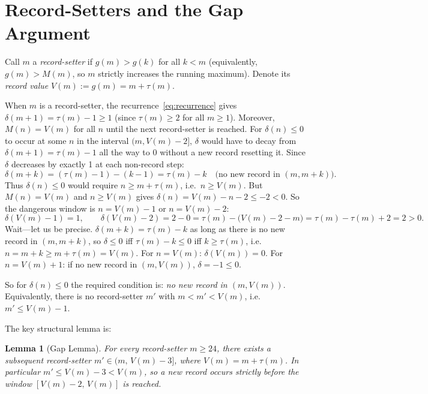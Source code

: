 \documentclass[12pt]{article}
\theoremstyle{plain}
\newtheorem{lemma}[theorem]{Lemma}
\theoremstyle{definition}
\begin{document}
\section{Record-Setters and the Gap Argument}

Call $m$ a \emph{record-setter} if $g(m) > g(k)$ for all $k < m$ (equivalently,
$g(m) > M(m)$, so $m$ strictly increases the running maximum).
Denote its \emph{record value} $V(m) := g(m) = m + \tau(m)$.

When $m$ is a record-setter, the recurrence~\eqref{eq:recurrence} gives
$\delta(m+1) = \tau(m) - 1 \geq 1$ (since $\tau(m) \geq 2$ for all $m \geq 1$).
Moreover, $M(n) = V(m)$ for all $n$ until the next record-setter is reached.
For $\delta(n) \leq 0$ to occur at some $n$ in the interval $(m, V(m)-2]$,
$\delta$ would have to decay from $\delta(m+1) = \tau(m)-1$ all the way to $0$ without
a new record resetting it.  Since $\delta$ decreases by exactly 1 at each non-record step:
\[
  \delta(m + k) = (\tau(m) - 1) - (k - 1) = \tau(m) - k
  \quad \text{(no new record in $(m, m+k)$)}.
\]
Thus $\delta(n) \leq 0$ would require $n \geq m + \tau(m)$, i.e.\ $n \geq V(m)$.
But $M(n) = V(m)$ and $n \geq V(m)$ gives $\delta(n) = V(m) - n - 2 \leq -2 < 0$.
So the dangerous window is $n = V(m) - 1$ or $n = V(m) - 2$:
\[
  \delta(V(m)-1) = 1, \qquad \delta(V(m)-2) = 2 - 0 = \tau(m) - \bigl(V(m)-2 - m\bigr) = \tau(m) - \tau(m) + 2 = 2 > 0.
\]
Wait---let us be precise. $\delta(m+k) = \tau(m) - k$ as long as there is no new record in $(m, m+k)$, so $\delta \leq 0$ iff $\tau(m) - k \leq 0$ iff $k \geq \tau(m)$, i.e.\ $n = m + k \geq m + \tau(m) = V(m)$.  For $n = V(m)$: $\delta(V(m)) = 0$.  For $n = V(m) + 1$: if no new record in $(m, V(m))$, $\delta = -1 \leq 0$.

So for $\delta(n) \leq 0$ the required condition is: \emph{no new record in $(m, V(m))$}.
Equivalently, there is no record-setter $m'$ with $m < m' < V(m)$, i.e.\ $m' \leq V(m)-1$.

The key structural lemma is:

\begin{lemma}[Gap Lemma]\label{lem:gap}
  For every record-setter $m \geq 24$, there exists a subsequent record-setter
  $m' \in (m,\, V(m) - 3]$, where $V(m) = m + \tau(m)$.
  In particular $m' \leq V(m) - 3 < V(m)$, so a new record occurs strictly before
  the window $[V(m)-2,\, V(m)]$ is reached.
\end{lemma}
\end{document}
